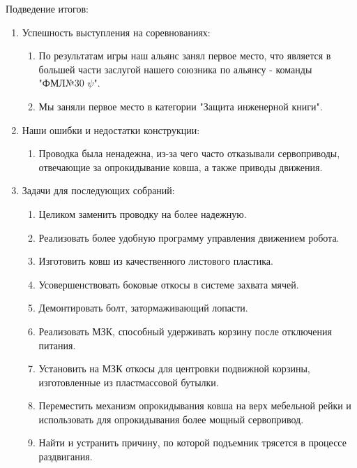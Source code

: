 Подведение итогов:
\begin{enumerate}
  \item Успешность выступления на соревнованиях:
  \begin{enumerate}
	\item По результатам игры наш альянс занял первое место, что является в большей части заслугой нашего союзника по альянсу - команды "ФМЛ№30 ${\psi}$".
	
	\item Мы заняли первое место в категории "Защита инженерной книги".
	
  \end{enumerate}
  
  \item Наши ошибки и недостатки конструкции:
  \begin{enumerate}
  	\item Проводка была ненадежна, из-за чего часто отказывали сервоприводы, отвечающие за опрокидывание ковша, а также приводы движения.
  	
  \end{enumerate}
  
  \item Задачи для последующих собраний:
  \begin{enumerate}
  	\item Целиком заменить проводку на более надежную.
  	
  	\item Реализовать более удобную программу управления движением робота.
  	
  	\item Изготовить ковш из качественного листового пластика.
  	
  	\item Усовершенствовать боковые откосы в системе захвата мячей.
  	
  	\item Демонтировать болт, затормаживающий лопасти.
  	
  	\item Реализовать МЗК, способный удерживать корзину после отключения питания.
  	  	
  	\item Установить на МЗК откосы для центровки подвижной корзины, изготовленные из пластмассовой бутылки.
  	
  	\item Переместить механизм опрокидывания ковша на верх мебельной рейки и использовать для опрокидывания более мощный сервопривод.
  	
  	\item Найти и устранить причину, по которой подъемник трясется в процессе раздвигания.
  	
  \end{enumerate}
  
\end{enumerate}
\fillpage